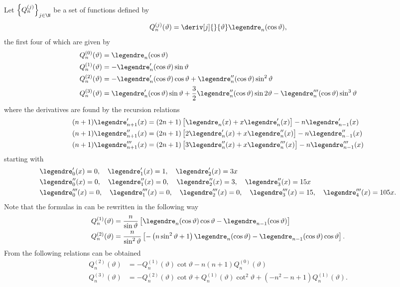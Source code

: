 Let $\left\{Q_n^{(j)}\right\}_{j\in\N}$ be a set of functions defined by
\begin{equation}
	Q_n^{(j)}(\vartheta) = \deriv[j]{}{\vartheta}\legendre_n(\cos\vartheta),
\end{equation}
the first four of which are given by
\begin{align}
\begin{split}\label{Eq1:Qs}
	Q_n^{(0)}(\vartheta) &= \legendre_n(\cos\vartheta)\\
	Q_n^{(1)}(\vartheta) &= - \legendre_n'(\cos\vartheta)\sin\vartheta\\
	Q_n^{(2)}(\vartheta) &= - \legendre_n'(\cos\vartheta)\cos\vartheta + \legendre_n''(\cos\vartheta)\sin^2\vartheta\\
	Q_n^{(3)}(\vartheta) &=  \legendre_n'(\cos\vartheta)\sin\vartheta  +\frac32 \legendre_n''(\cos\vartheta)\sin 2\vartheta - \legendre_n'''(\cos\vartheta)\sin^3\vartheta\\
	\end{split}
\end{align}
where the derivatives are found by the recursion relations
\begin{align}
	&(n+1)\legendre_{n+1}'(x)=(2n+1)\left[\legendre_n(x)+x \legendre_n'(x)\right]-n\legendre_{n-1}'(x)\\
	&(n+1)\legendre_{n+1}''(x)=(2n+1)\left[2\legendre_n'(x)+ x\legendre_n''(x)\right]-n\legendre_{n-1}''(x)\\
	&(n+1)\legendre_{n+1}'''(x)=(2n+1)\left[3\legendre_n''(x)+x \legendre_n'''(x)\right]-n\legendre_{n-1}'''(x)
\end{align}
starting with 
\begin{align*}
	&\legendre_0'(x) = 0,\quad \legendre_1'(x) = 1, \quad \legendre_2'(x) = 3x\\
	&\legendre_0''(x) = 0,\quad \legendre_1''(x) = 0, \quad \legendre_2''(x) = 3, \quad \legendre_3''(x) = 15x\\
	&\legendre_0'''(x) = 0,\quad \legendre_1'''(x) = 0, \quad \legendre_2'''(x) = 0, \quad \legendre_3'''(x) = 15, \quad \legendre_4'''(x) = 105x.
\end{align*}
Note that the formulas in  can be rewritten in the following way
\begin{align}
	Q_n^{(1)}(\vartheta) &= \frac{n}{\sin\vartheta} \left[ \legendre_n(\cos\vartheta)\cos\vartheta - \legendre_{n-1}(\cos\vartheta)\right]\\
	Q_n^{(2)}(\vartheta) &= \frac{n}{\sin^2\vartheta} \left[-\left(n\sin^2\vartheta+1 \right)\legendre_n(\cos\vartheta) -  \legendre_{n-1}(\cos\vartheta)\cos\vartheta\right].
\end{align}
From  the following relations can be obtained
\begin{align}\label{Eq1:expandedLegendreEquationIdentity2}
	Q_n^{(2)}(\vartheta) &= - Q_n^{(1)}(\vartheta)\cot\vartheta -n(n+1)Q_n^{(0)}(\vartheta)\\
	Q_n^{(3)}(\vartheta) &= - Q_n^{(2)}(\vartheta)\cot\vartheta + Q_n^{(1)}(\vartheta)\cot^2\vartheta + (-n^2-n+1)Q_n^{(1)}(\vartheta).\label{Eq1:expandedLegendreEquationIdentity3}
\end{align}

